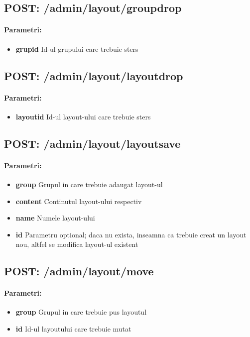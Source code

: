  \subsection*{POST: /admin/layout/groupdrop}

\paragraph{Parametri:}
\begin{itemize}
\item \textbf{grupid}
 Id-ul grupului care trebuie sters
 \end{itemize}
 \subsection*{POST: /admin/layout/layoutdrop}

\paragraph{Parametri:}
\begin{itemize}
\item \textbf{layoutid}
 Id-ul layout-ului care trebuie sters
 \end{itemize}
 \subsection*{POST: /admin/layout/layoutsave}

\paragraph{Parametri:}
\begin{itemize}
\item \textbf{group}
 Grupul in care trebuie adaugat layout-ul
\item \textbf{content}
 Continutul layout-ului respectiv
\item \textbf{name}
 Numele layout-ului
\item \textbf{id}
 Parametru optional; daca nu exista, inseamna ca trebuie creat un layout nou, altfel se modifica layout-ul existent
 \end{itemize}
 \subsection*{POST: /admin/layout/move}

\paragraph{Parametri:}
\begin{itemize}
\item \textbf{group}
 Grupul in care trebuie pus layoutul
\item \textbf{id}
 Id-ul layoutului care trebuie mutat
 \end{itemize}
